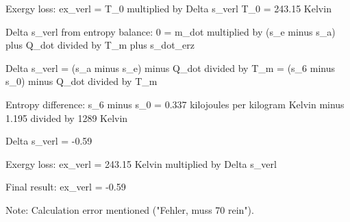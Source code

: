 Exergy loss:  
ex_verl = T_0 multiplied by Delta s_verl  
T_0 = 243.15 Kelvin  

Delta s_verl from entropy balance:  
0 = m_dot multiplied by (s_e minus s_a) plus Q_dot divided by T_m plus s_dot_erz  

Delta s_verl = (s_a minus s_e) minus Q_dot divided by T_m = (s_6 minus s_0) minus Q_dot divided by T_m  

Entropy difference:  
s_6 minus s_0 = 0.337 kilojoules per kilogram Kelvin minus 1.195 divided by 1289 Kelvin  

Delta s_verl = -0.59  

Exergy loss:  
ex_verl = 243.15 Kelvin multiplied by Delta s_verl  

Final result:  
ex_verl = -0.59  

Note: Calculation error mentioned ("Fehler, muss 70 rein").